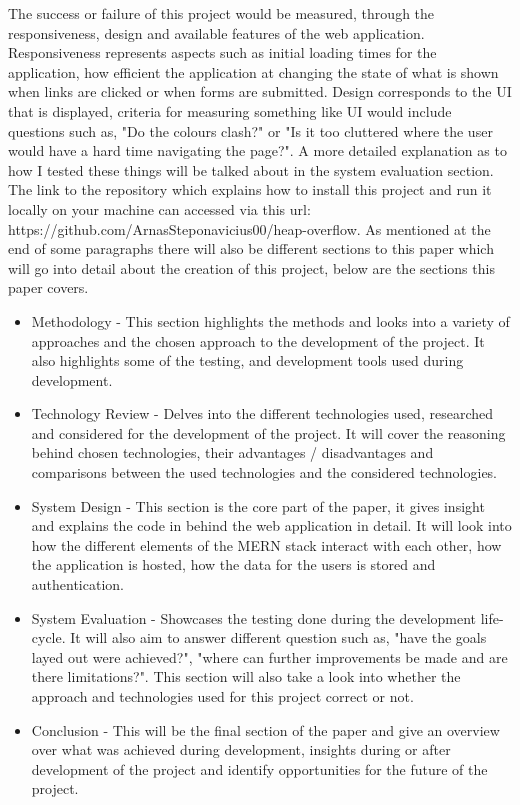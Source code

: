 The success or failure of this project would be measured, through the responsiveness, design and available features of the web application. Responsiveness represents aspects such as initial loading times for the application, how efficient the application at changing the state of what is shown when links are clicked or when forms are submitted. Design corresponds to the UI that is displayed, criteria for measuring something like UI would include questions such as, "Do the colours clash?" or "Is it too cluttered where the user would have a hard time navigating the page?". A more detailed explanation as to how I tested these things will be talked about in the system evaluation section.
 The link to the repository which explains how to install this project and run it locally on your machine can accessed via this url: https://github.com/ArnasSteponavicius00/heap-overflow. As mentioned at the end of some paragraphs there will also be different sections to this paper which will go into detail about the creation of this project, below are the sections this paper covers.
 \begin{itemize}
     \item Methodology - This section highlights the methods and looks into a variety of approaches and the chosen approach to the development of the project. It also highlights some of the testing, and development tools used during development.
     \item Technology Review - Delves into the different technologies used, researched and considered for the development of the project. It will cover the reasoning behind chosen technologies, their advantages / disadvantages and comparisons between the used technologies and the considered technologies.
     \item System Design - This section is the core part of the paper, it gives insight and explains the code in behind the web application in detail. It will look into how the different elements of the MERN stack interact with each other, how the application is hosted, how the data for the users is stored and authentication.
     \item System Evaluation - Showcases the testing done during the development life-cycle. It will also aim to answer different question such as, "have the goals layed out were achieved?", "where can further improvements be made and are there limitations?". This section will also take a look into whether the approach and technologies used for this project correct or not.
     \item Conclusion - This will be the final section of the paper and give an overview over what was achieved during development, insights during or after development of the project and identify opportunities for the future of the project.
 \end{itemize}
 

